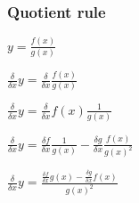 \subsubsection{Quotient rule}

$y=\frac{f(x)}{g(x)}$

$\frac{\delta }{\delta x}y=\frac{\delta }{\delta x}\frac{f(x)}{g(x)}$

$\frac{\delta }{\delta x}y=\frac{\delta }{\delta x}f(x)\frac{1}{g(x)}$

$\frac{\delta }{\delta x}y=\frac{\delta f}{\delta x}\frac{1}{g(x)}-\frac{\delta g}{\delta x}\frac{f(x)}{g(x)^2}$

$\frac{\delta }{\delta x}y=\frac{\frac{\delta f}{\delta x}g(x)-\frac{\delta g}{\delta x}f(x)}{g(x)^2}$

